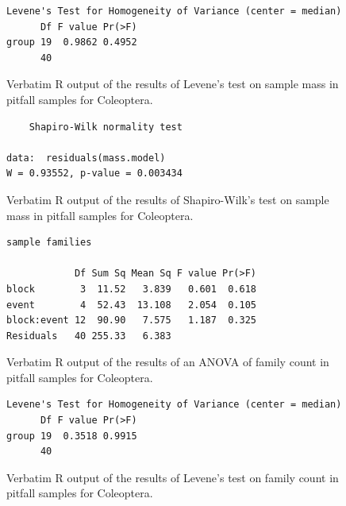 \documentclass[10pt,letterpaper,twocolumn]{article}
\begin{document}
\begin{figure}[h]
	\lstset{numbers=left}
	\lstset{xleftmargin=5mm,framexleftmargin=5mm}
	\begin{lstlisting}
Levene's Test for Homogeneity of Variance (center = median)
      Df F value Pr(>F)
group 19  0.9862 0.4952
      40               
	\end{lstlisting}
	\caption{Verbatim R output of the results of Levene's test on sample mass in pitfall samples for Coleoptera.}
	\label{fig:pitfall_coleoptera_mass_levene}
	\smallskip
	\nointerlineskip
	\hrulefill
\end{figure}

\begin{figure}[h]
	\lstset{numbers=left}
	\lstset{xleftmargin=5mm,framexleftmargin=5mm}
	\begin{lstlisting}
	Shapiro-Wilk normality test

data:  residuals(mass.model)
W = 0.93552, p-value = 0.003434
	\end{lstlisting}
	\caption{Verbatim R output of the results of Shapiro-Wilk's test on sample mass in pitfall samples for Coleoptera.}
	\label{fig:pitfall_coleoptera_mass_shapiro}
	\smallskip
	\nointerlineskip
	\hrulefill
\end{figure}

\begin{figure}[h]
	\lstset{numbers=left}
	\lstset{xleftmargin=5mm,framexleftmargin=5mm}
	\begin{lstlisting}
sample families 

            Df Sum Sq Mean Sq F value Pr(>F)
block        3  11.52   3.839   0.601  0.618
event        4  52.43  13.108   2.054  0.105
block:event 12  90.90   7.575   1.187  0.325
Residuals   40 255.33   6.383               
	\end{lstlisting}
	\caption{Verbatim R output of the results of an ANOVA of family count in pitfall samples for Coleoptera.}
	\label{fig:pitfall_coleoptera_family_anova}
	\smallskip
	\nointerlineskip
	\hrulefill
\end{figure}

\begin{figure}[h]
	\lstset{numbers=left}
	\lstset{xleftmargin=5mm,framexleftmargin=5mm}
	\begin{lstlisting}
Levene's Test for Homogeneity of Variance (center = median)
      Df F value Pr(>F)
group 19  0.3518 0.9915
      40               
	\end{lstlisting}
	\caption{Verbatim R output of the results of Levene's test on family count in pitfall samples for Coleoptera.}
	\label{fig:pitfall_coleoptera_family_levene}
	\smallskip
	\nointerlineskip
	\hrulefill
\end{figure}
\end{document}
